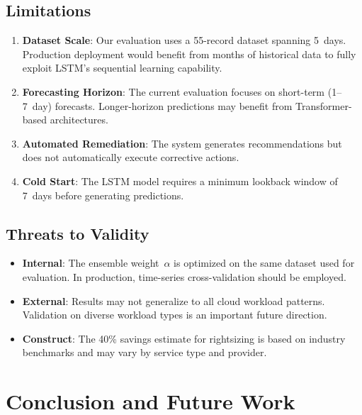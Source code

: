 \documentclass[conference]{IEEEtran}
\begin{document}
\subsection{Limitations}

\begin{enumerate}
    \item \textbf{Dataset Scale}: Our evaluation uses a 55-record dataset spanning 5~days. Production deployment would benefit from months of historical data to fully exploit LSTM's sequential learning capability.
    
    \item \textbf{Forecasting Horizon}: The current evaluation focuses on short-term (1--7~day) forecasts. Longer-horizon predictions may benefit from Transformer-based architectures.
    
    \item \textbf{Automated Remediation}: The system generates recommendations but does not automatically execute corrective actions.
    
    \item \textbf{Cold Start}: The LSTM model requires a minimum lookback window of 7~days before generating predictions.
\end{enumerate}

\subsection{Threats to Validity}

\begin{itemize}
    \item \textbf{Internal}: The ensemble weight~$\alpha$ is optimized on the same dataset used for evaluation. In production, time-series cross-validation should be employed.
    \item \textbf{External}: Results may not generalize to all cloud workload patterns. Validation on diverse workload types is an important future direction.
    \item \textbf{Construct}: The 40\% savings estimate for rightsizing is based on industry benchmarks and may vary by service type and provider.
\end{itemize}

\section{Conclusion and Future Work}
\label{sec:conclusion}
\end{document}
